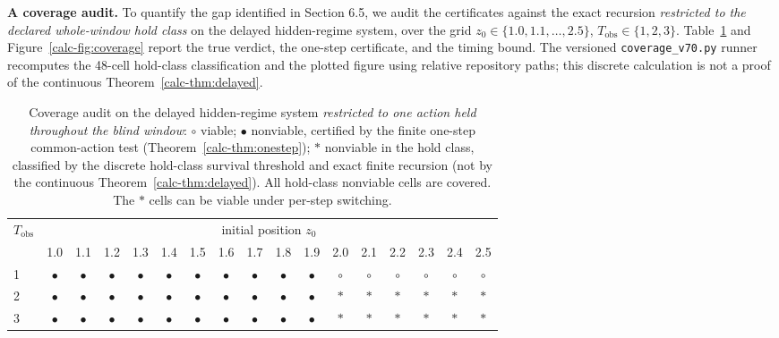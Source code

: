 \documentclass[10pt,twocolumn]{article}
\theoremstyle{definition}
\begin{document}
\textbf{A coverage audit.} To quantify the gap identified in Section 6.5, we audit the certificates against the exact recursion \emph{restricted to the declared whole-window hold class} on the delayed hidden-regime system, over the grid \(z_{0} \in \{1.0, 1.1, \dots, 2.5\}\), \(T_{\mathrm{obs}} \in \{1,2,3\}\). Table~\ref{calc-tab:coverage} and Figure~\ref{calc-fig:coverage} report the true verdict, the one-step certificate, and the timing bound. The versioned \texttt{coverage\_v70.py} runner recomputes the 48-cell hold-class classification and the plotted figure using relative repository paths; this discrete calculation is not a proof of
the continuous Theorem~\ref{calc-thm:delayed}.

\begin{table}[t]
\centering
\footnotesize
\begin{tabular}{@{}lcccccccccccccccc@{}}
\toprule
\(T_{\mathrm{obs}}\) & \multicolumn{16}{c}{initial position \(z_{0}\)} \\
\cmidrule(lr){2-17}
 & 1.0 & 1.1 & 1.2 & 1.3 & 1.4 & 1.5 & 1.6 & 1.7 & 1.8 & 1.9 & 2.0 & 2.1 & 2.2 & 2.3 & 2.4 & 2.5 \\
\midrule
1 & \(\bullet\) & \(\bullet\) & \(\bullet\) & \(\bullet\) & \(\bullet\) & \(\bullet\) & \(\bullet\) & \(\bullet\) & \(\bullet\) & \(\bullet\) & \(\circ\) & \(\circ\) & \(\circ\) & \(\circ\) & \(\circ\) & \(\circ\) \\
2 & \(\bullet\) & \(\bullet\) & \(\bullet\) & \(\bullet\) & \(\bullet\) & \(\bullet\) & \(\bullet\) & \(\bullet\) & \(\bullet\) & \(\bullet\) & \(\ast\) & \(\ast\) & \(\ast\) & \(\ast\) & \(\ast\) & \(\ast\) \\
3 & \(\bullet\) & \(\bullet\) & \(\bullet\) & \(\bullet\) & \(\bullet\) & \(\bullet\) & \(\bullet\) & \(\bullet\) & \(\bullet\) & \(\bullet\) & \(\ast\) & \(\ast\) & \(\ast\) & \(\ast\) & \(\ast\) & \(\ast\) \\
\bottomrule
\end{tabular}
\caption{Coverage audit on the delayed hidden-regime system \emph{restricted to one action held throughout the blind window}: \(\circ\) viable; \(\bullet\) nonviable, certified by the finite one-step common-action test (Theorem~\ref{calc-thm:onestep}); \(\ast\) nonviable in the hold class, classified by the discrete hold-class survival threshold and exact finite recursion (not by the continuous Theorem~\ref{calc-thm:delayed}). All hold-class nonviable cells are covered. The \(\ast\) cells can be viable under per-step switching.}
\label{calc-tab:coverage}
\end{table}
\end{document}
